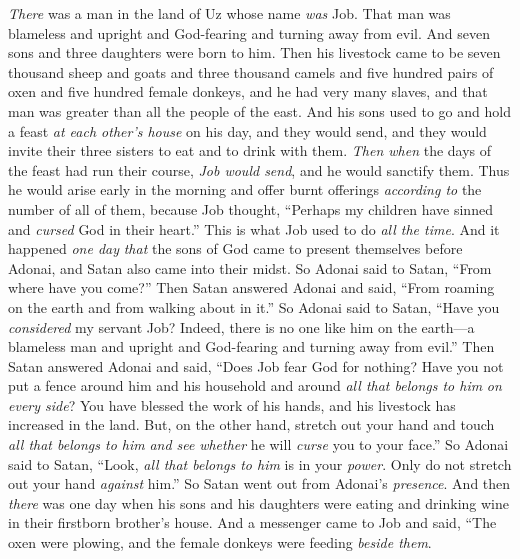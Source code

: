 
\begin{biblechapter} %
 \textit{There} was a man in the land of Uz whose name \textit{was} Job. That man was blameless and upright and God-fearing and turning away from evil.
\verse And seven sons and three daughters were born to him.
\verse Then his livestock came to be seven thousand sheep and goats and three thousand camels and five hundred pairs of oxen and five hundred female donkeys, and he had very many slaves, and that man was greater than all the people of the east.
\verse And his sons used to go and hold a feast \textit{at each other’s house} on his day, and they would send, and they would invite their three sisters to eat and to drink with them.
\verse \textit{Then when} the days of the feast had run their course, \textit{Job would send}, and he would sanctify them. Thus he would arise early in the morning and offer burnt offerings \textit{according to} the number of all of them, because Job thought, “Perhaps my children have sinned and \textit{cursed} God in their heart.” This is what Job used to do \textit{all the time}.
\verse And it happened \textit{one day} \textit{that} the sons of God came to present themselves before Adonai, and Satan also came into their midst.
\verse So Adonai said to Satan, “From where have you come?” Then Satan answered Adonai and said, “From roaming on the earth and from walking about in it.”
\verse So Adonai said to Satan, “Have you \textit{considered} my servant Job? Indeed, there is no one like him on the earth—a blameless man and upright and God-fearing and turning away from evil.”
\verse Then Satan answered Adonai and said, “Does Job fear God for nothing?
\verse Have you not put a fence around him and his household and around \textit{all that belongs to him} \textit{on every side}? You have blessed the work of his hands, and his livestock has increased in the land.
\verse But, on the other hand, stretch out your hand and touch \textit{all that belongs to him} \textit{and see} \textit{whether} he will \textit{curse} you to your face.”
\verse So Adonai said to Satan, “Look, \textit{all that belongs to him} is in your \textit{power}. Only do not stretch out your hand \textit{against} him.” So Satan went out from Adonai’s \textit{presence}.
 And then \textit{there} was one day when his sons and his daughters were eating and drinking wine in their firstborn brother’s house.
\verse And a messenger came to Job and said, “The oxen were plowing, and the female donkeys were feeding \textit{beside them}.

\end{biblechapter}
